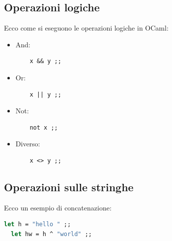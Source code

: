 \documentclass[12pt,a4paper]{article}
\begin{document}
\subsection{Operazioni logiche}
Ecco come si eseguono le operazioni logiche in OCaml:
\begin{itemize}
  \item And:
  \begin{lstlisting}
    x && y ;;
  \end{lstlisting}
  \item Or:
  \begin{lstlisting}
    x || y ;;
  \end{lstlisting}
  \item Not:
  \begin{lstlisting}
    not x ;;
  \end{lstlisting}
  \item Diverso:
  \begin{lstlisting}
    x <> y ;;
  \end{lstlisting}
\end{itemize}
\subsection{Operazioni sulle stringhe}
Ecco un esempio di concatenazione:
\begin{lstlisting}[language=OCaml]
  let h = "hello " ;;
  let hw = h ^ "world" ;;
\end{lstlisting}
\end{document}
